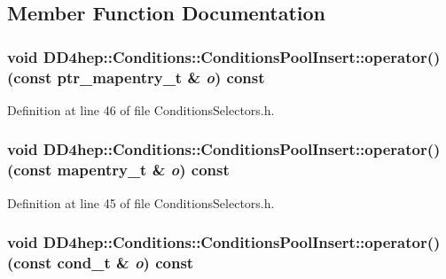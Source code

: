 \subsection{Member Function Documentation}
\hypertarget{class_d_d4hep_1_1_conditions_1_1_conditions_pool_insert_a5615cc1a9788b6d79e3e98fc44bb3468}{
\subsubsection[{operator()}]{\setlength{\rightskip}{0pt plus 5cm}void DD4hep::Conditions::ConditionsPoolInsert::operator() (const {\bf ptr\_\-mapentry\_\-t} \& {\em o}) const}}
\label{class_d_d4hep_1_1_conditions_1_1_conditions_pool_insert_a5615cc1a9788b6d79e3e98fc44bb3468}


Definition at line 46 of file ConditionsSelectors.h.\hypertarget{class_d_d4hep_1_1_conditions_1_1_conditions_pool_insert_a0164654db9934344ba4189b52e4b292e}{
\subsubsection[{operator()}]{\setlength{\rightskip}{0pt plus 5cm}void DD4hep::Conditions::ConditionsPoolInsert::operator() (const {\bf mapentry\_\-t} \& {\em o}) const}}
\label{class_d_d4hep_1_1_conditions_1_1_conditions_pool_insert_a0164654db9934344ba4189b52e4b292e}


Definition at line 45 of file ConditionsSelectors.h.\hypertarget{class_d_d4hep_1_1_conditions_1_1_conditions_pool_insert_ab87be01d46494de9dfc93d4a2b554843}{
\subsubsection[{operator()}]{\setlength{\rightskip}{0pt plus 5cm}void DD4hep::Conditions::ConditionsPoolInsert::operator() (const {\bf cond\_\-t} \& {\em o}) const}}
\label{class_d_d4hep_1_1_conditions_1_1_conditions_pool_insert_ab87be01d46494de9dfc93d4a2b554843}


